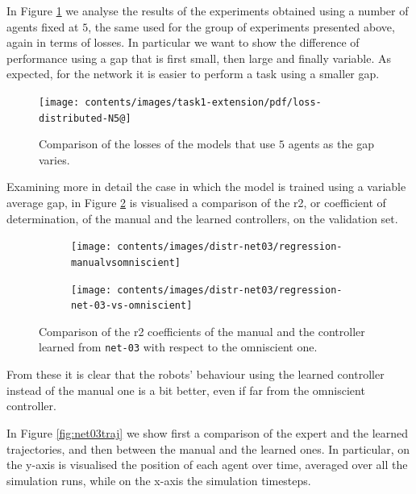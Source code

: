 In Figure \ref{fig:distlossn5} we analyse the results of the experiments 
obtained using a number of agents fixed at $5$, the same used for the group of 
experiments presented above, again in terms of losses. In particular we want 
to show the difference of performance using a gap that is first small, then large 
and finally variable.
As expected, for the network it is easier to perform a task using a smaller 
gap.
\begin{figure}[!htb]
	\centering
	\texttt{[image: contents/images/task1-extension/pdf/loss-distributed-N5@]}%
	\caption{Comparison of the losses of the models that use $5$ agents as 
	the gap 
	varies.}
	\label{fig:distlossn5}
\end{figure}

Examining more in detail the case in which the model is trained using a 
variable 
average gap, in Figure \ref{fig:net03r2} is visualised a comparison of the 
\gls{r2}, 
or coefficient of determination, of the manual and the learned controllers, on 
the 
validation set.
\begin{figure}[!htb]
	\centering
	\begin{subfigure}[h]{0.49\textwidth}
		\centering
		\texttt{[image: contents/images/distr-net03/regression-manualvsomniscient]}%
	\end{subfigure}
	\hfill
	\begin{subfigure}[h]{0.49\textwidth}
		\centering
		\texttt{[image: contents/images/distr-net03/regression-net-03-vs-omniscient]}
	\end{subfigure}
	\caption[Evaluation of the \gls{r2} coefficients of \texttt{net-03} 
	.]{Comparison 
	of the \gls{r2} coefficients of the manual and the controller learned from 
	\texttt{net-03} with respect to the omniscient one.}
	\label{fig:net03r2}
\end{figure}
From these it is clear that the robots' behaviour using the learned controller 
instead of the manual one is a bit better, even if far from the omniscient 
controller.

In Figure \ref{fig:net03traj} we show first a comparison of the expert and the 
learned trajectories, and then between the manual and the learned ones. In 
particular, on the y-axis is visualised the position of each agent over time, 
averaged over all the simulation runs, while on the x-axis the simulation 
timesteps. 

